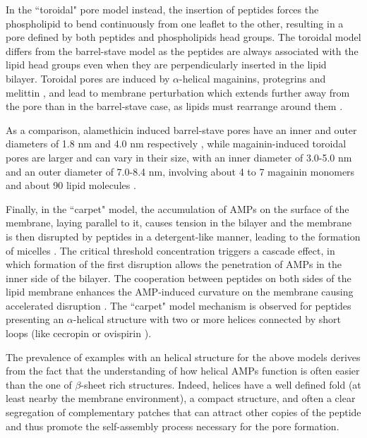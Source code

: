 In the ``toroidal" pore model instead, the insertion of peptides forces the phospholipid to bend continuously from one leaflet to the other, resulting in a pore defined by both peptides and phospholipids head groups.
%
The toroidal model differs from the barrel-stave model as the peptides are always associated with the lipid head groups even when they are perpendicularly inserted in the lipid  bilayer. Toroidal pores are induced by $\alpha$-helical magainins, protegrins and melittin \cite{Yang2001,Matsuzaki1996,Hallock2003}, and lead to membrane perturbation which extends further away from the pore than in the barrel-stave case, as lipids must rearrange around them \cite{Bertelsen2012}.

As a comparison, alamethicin induced barrel-stave pores have an inner and outer diameters of 1.8 nm and 4.0 nm respectively \cite{Spaar2004,He1995}, while magainin-induced toroidal pores are larger and can vary in their size, with an inner diameter of 3.0-5.0 nm and an outer diameter of 7.0-8.4 nm, involving about 4 to 7 magainin monomers and about 90 lipid molecules \cite{Matsuzaki1998,Matsuzaki1997}.

Finally, in the ``carpet" model, the accumulation of AMPs on the surface of the membrane, laying parallel to it, causes tension in the bilayer and the membrane is then disrupted by peptides in a detergent-like manner, leading to the formation of micelles \cite{Shai1999,Ladokhin2001}.
%
The critical threshold concentration triggers a cascade effect, in which formation of the first disruption allows the penetration of AMPs in the inner side of the bilayer. The cooperation between peptides on both sides of the lipid membrane enhances the AMP-induced curvature on the membrane causing accelerated disruption \cite{Oren1998}.
%
The ``carpet" model mechanism is observed for peptides presenting an $\alpha$-helical structure with two or more helices connected by short loops (like cecropin \cite{Gazit1995} or ovispirin \cite{Yamaguchi2001}).

The prevalence of examples with an helical structure for the above models derives from the fact that the understanding of how helical AMPs function is often easier than the one of $\beta$-sheet rich structures.
%
Indeed, helices have a well defined fold (at least nearby the membrane environment), a compact structure, and often a clear segregation of complementary patches that can attract other copies of the peptide and thus promote the self-assembly process necessary for the pore formation.

